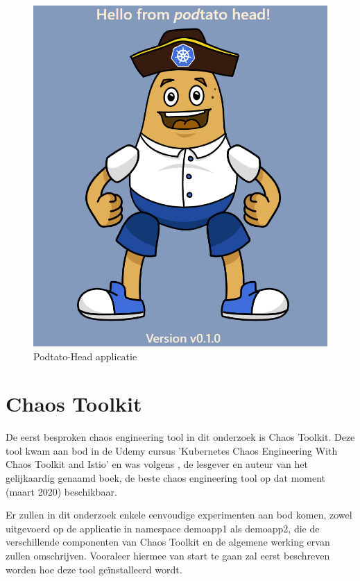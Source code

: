 \begin{figure}[h]
    \centering
    \includegraphics[scale=.5]{img/podtatohead-app.png}
    \caption{Podtato-Head applicatie}
    \label{img:podtato-head}
\end{figure}

\section{Chaos Toolkit}

De eerst besproken chaos engineering tool in dit onderzoek is Chaos Toolkit. Deze tool kwam aan bod in de Udemy cursus 'Kubernetes Chaos Engineering With Chaos Toolkit and Istio' en was volgens \textcite{Viktor Farcic}, de lesgever en auteur van het gelijkaardig genaamd boek, de beste chaos engineering tool op dat moment (maart 2020) beschikbaar. 

Er zullen in dit onderzoek enkele eenvoudige experimenten aan bod komen, zowel uitgevoerd op de applicatie in namespace demoapp1 als demoapp2, die de verschillende componenten van Chaos Toolkit en de algemene werking ervan zullen omschrijven. Vooraleer hiermee van start te gaan zal eerst beschreven worden hoe deze tool geïnstalleerd wordt.    

